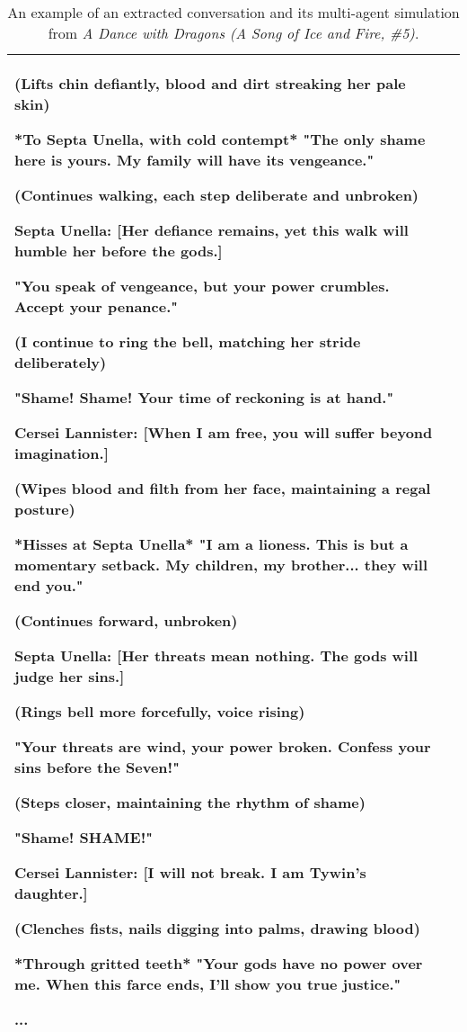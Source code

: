 \begin{table*}[h]
{\begin{tabular}{p{1in}|p{5.4in}}
(Lifts chin defiantly, blood and dirt streaking her pale skin)

*To Septa Unella, with cold contempt* "The only shame here is yours. My family will have its vengeance."

(Continues walking, each step deliberate and unbroken)

\quad

Septa Unella: [Her defiance remains, yet this walk will humble her before the gods.]

"You speak of vengeance, but your power crumbles. Accept your penance."

(I continue to ring the bell, matching her stride deliberately)

"Shame! Shame! Your time of reckoning is at hand."

\quad

Cersei Lannister: [When I am free, you will suffer beyond imagination.]

(Wipes blood and filth from her face, maintaining a regal posture)

*Hisses at Septa Unella* "I am a lioness. This is but a momentary setback. My children, my brother... they will end you."

(Continues forward, unbroken)

\quad

Septa Unella: [Her threats mean nothing. The gods will judge her sins.]

(Rings bell more forcefully, voice rising)

"Your threats are wind, your power broken. Confess your sins before the Seven!"

(Steps closer, maintaining the rhythm of shame)

"Shame! SHAME!"

\quad

Cersei Lannister: [I will not break. I am Tywin's daughter.]

(Clenches fists, nails digging into palms, drawing blood)

*Through gritted teeth* "Your gods have no power over me. When this farce ends, I'll show you true justice."

...
\\ 
    
\bottomrule

\end{tabular}}

\caption{An example of an extracted conversation and its multi-agent simulation from \textit{A Dance with Dragons (A Song of Ice and Fire, \#5)}.}
\label{tab:case_cerci4}
\end{table*}

